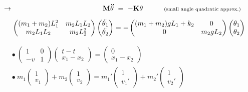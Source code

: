 \documentclass[12pt]{article}
\begin{document}
\vspace{15pt}\noindent
\(\rightarrow \begin{aligned}[t]
    \mathbf{M\ddot{\theta}} &\ = \ -\mathbf{K\theta} \indent\indent \text{\scriptsize(small angle quadratic approx.)}\\[5pt]
    \left(\begin{matrix}
        (m_1+m_2)L_1^2 & m_2 L_1 L_2 \\
        m_2 L_1 L_2 & m_2 L_2^2
    \end{matrix}\right)
    \left(\begin{matrix}
        \ddot{\theta_1}\\
        \ddot{\theta_2}
    \end{matrix}\right) &= 
        -\left(\begin{matrix}
            (m_1+m_2) g L_1 + k_2 & 0\\
            0 & m_2 g L_2
        \end{matrix}\right)
        \left(\begin{matrix}
            \theta_1\\
            \theta_2
        \end{matrix}\right)
\end{aligned}\)

\vspace{20pt}
\(
    \begin{aligned}
        & \bullet\    
            \left( \begin{matrix}
                1 & 0 \\
                -v & 1
            \end{matrix} \right)
            \left( \begin{matrix}
                t-t\\
                x_1-x_2
            \end{matrix} \right)
            = 
            \left( \begin{matrix}
                0\\
                x_1-x_2
            \end{matrix} \right)
            \\
        & \bullet\ 
            m_1 \left( \begin{matrix}
                1\\
                v_1
            \end{matrix} \right)
            + 
            m_2 \left( \begin{matrix}
                1\\
                v_2
            \end{matrix} \right)
            =
            m_1' \left( \begin{matrix}
                1\\
                v_1'
            \end{matrix} \right)
            + 
            m_2' \left( \begin{matrix}
                1\\
                v_2'
            \end{matrix} \right)
        \end{aligned}
\)
\end{document}
